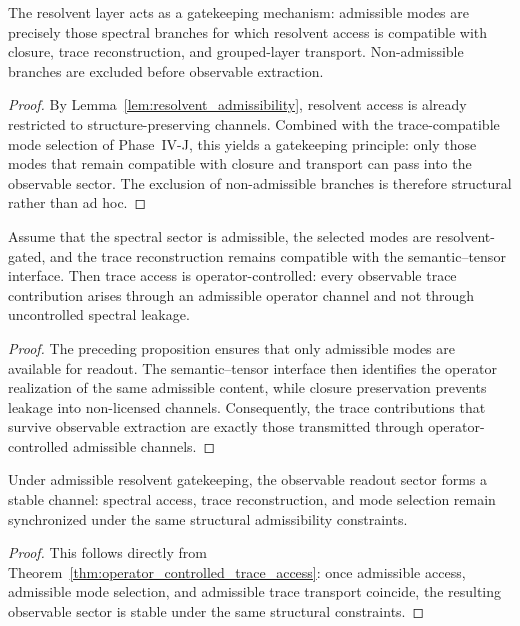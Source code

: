 \begin{proposition}\label{prop:resolvent_gatekeeping}
The resolvent layer acts as a gatekeeping mechanism: admissible modes are precisely those spectral branches for which resolvent access is compatible with closure, trace reconstruction, and grouped-layer transport. Non-admissible branches are excluded before observable extraction.
\end{proposition}
\begin{proof}
By Lemma~\ref{lem:resolvent_admissibility}, resolvent access is already restricted to structure-preserving channels. Combined with the trace-compatible mode selection of Phase~IV-J, this yields a gatekeeping principle: only those modes that remain compatible with closure and transport can pass into the observable sector. The exclusion of non-admissible branches is therefore structural rather than ad hoc.
\end{proof}

\begin{theorem}\label{thm:operator_controlled_trace_access}
Assume that the spectral sector is admissible, the selected modes are resolvent-gated, and the trace reconstruction remains compatible with the semantic--tensor interface. Then trace access is operator-controlled: every observable trace contribution arises through an admissible operator channel and not through uncontrolled spectral leakage.
\end{theorem}
\begin{proof}
The preceding proposition ensures that only admissible modes are available for readout. The semantic--tensor interface then identifies the operator realization of the same admissible content, while closure preservation prevents leakage into non-licensed channels. Consequently, the trace contributions that survive observable extraction are exactly those transmitted through operator-controlled admissible channels.
\end{proof}

\begin{corollary}\label{cor:stable_observable_channel}
Under admissible resolvent gatekeeping, the observable readout sector forms a stable channel: spectral access, trace reconstruction, and mode selection remain synchronized under the same structural admissibility constraints.
\end{corollary}
\begin{proof}
This follows directly from Theorem~\ref{thm:operator_controlled_trace_access}: once admissible access, admissible mode selection, and admissible trace transport coincide, the resulting observable sector is stable under the same structural constraints.
\end{proof}

